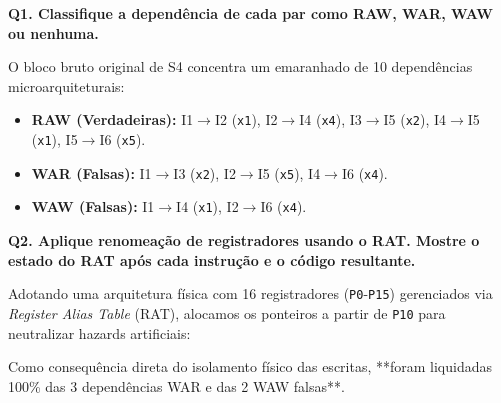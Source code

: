 \documentclass[12pt,a4paper]{article}
\begin{document}
\textbf{Q1. Classifique a dependência de cada par como RAW, WAR, WAW ou nenhuma.}

O bloco bruto original de S4 concentra um emaranhado de 10 dependências microarquiteturais:
\begin{itemize}
    \item \textbf{RAW (Verdadeiras):} I1$\rightarrow$I2 (\texttt{x1}), I2$\rightarrow$I4 (\texttt{x4}), I3$\rightarrow$I5 (\texttt{x2}), I4$\rightarrow$I5 (\texttt{x1}), I5$\rightarrow$I6 (\texttt{x5}).
    \item \textbf{WAR (Falsas):} I1$\rightarrow$I3 (\texttt{x2}), I2$\rightarrow$I5 (\texttt{x5}), I4$\rightarrow$I6 (\texttt{x4}).
    \item \textbf{WAW (Falsas):} I1$\rightarrow$I4 (\texttt{x1}), I2$\rightarrow$I6 (\texttt{x4}).
\end{itemize}

\textbf{Q2. Aplique renomeação de registradores usando o RAT. Mostre o estado do RAT após cada instrução e o código resultante.}

Adotando uma arquitetura física com 16 registradores (\texttt{P0}-\texttt{P15}) gerenciados via \textit{Register Alias Table} (RAT), alocamos os ponteiros a partir de \texttt{P10} para neutralizar hazards artificiais:

\begin{table}[H]
\centering
\caption{Evolução do RAT e Código Renomeado}
\end{table}
Como consequência direta do isolamento físico das escritas, **foram liquidadas 100\% das 3 dependências WAR e das 2 WAW falsas**.
\end{document}
